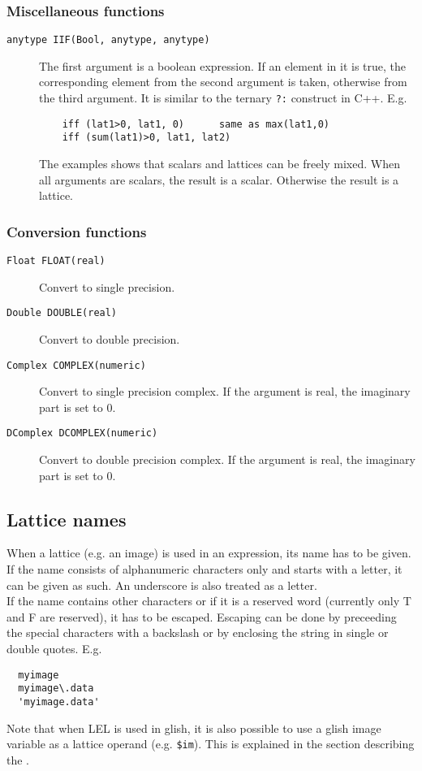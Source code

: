 \subsubsection{Miscellaneous functions}
\begin{description}
  \item[ \texttt{anytype IIF(Bool, anytype, anytype)}]
    The first argument is a boolean expression. If an element in
    it is true, the corresponding element from the second argument is
    taken, otherwise from the third argument. It is similar to the
    ternary \texttt{?:} construct in C++. E.g.
    \begin{verbatim}
    iff (lat1>0, lat1, 0)      same as max(lat1,0)
    iff (sum(lat1)>0, lat1, lat2)
    \end{verbatim}
    The examples shows that scalars and lattices can be freely mixed.
    When all arguments are scalars, the result is a scalar. Otherwise
    the result is a lattice.
\end{description}

\subsubsection{Conversion functions}
\begin{description}
  \item[ \texttt{Float FLOAT(real)}]
    Convert to single precision.
  \item[ \texttt{Double DOUBLE(real)}]
    Convert to double precision.
  \item[ \texttt{Complex COMPLEX(numeric)}]
    Convert to single precision complex.
    If the argument is real, the imaginary part is set to 0.
  \item[ \texttt{DComplex DCOMPLEX(numeric)}]
    Convert to double precision complex.
    If the argument is real, the imaginary part is set to 0.
\end{description}

\subsection{\label{LEL:LATTICES}Lattice names}
When a lattice (e.g. an image) is used in an expression, its name
has to be given. If the name consists of alphanumeric characters only
and starts with a letter, it can be given as such. An underscore is
also treated as a letter.
\\If the name contains other characters or if it is a reserved word
(currently only T and F are reserved), it has to be escaped.
Escaping can be done by preceeding the special characters with a
backslash or by enclosing the string in single or double quotes.
E.g.
\begin{verbatim}
  myimage  
  myimage\.data
  'myimage.data'
\end{verbatim}
Note that when LEL is used in glish, it is also possible to use
a glish image variable as a lattice operand (e.g. \texttt{\$im}).
This is explained in the section describing the
.

